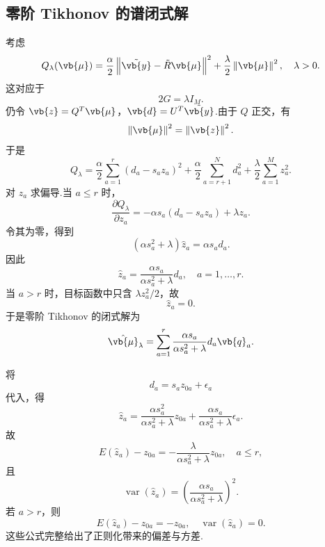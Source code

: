 \subsection{零阶 Tikhonov 的谱闭式解}

考虑
\begin{equation*}
	Q_\lambda(\vb{\mu})
	=\frac{\alpha}{2}\left\|\tilde{\vb{y}}-\tilde{R}\vb{\mu}\right\|^2
	+\frac{\lambda}{2}\left\|\vb{\mu}\right\|^2,
	\quad \lambda>0.
\end{equation*}
这对应于
\begin{equation*}
	2G=\lambda I_M.
\end{equation*}
仍令 \(\vb{z}=Q^T\vb{\mu}\)，\(\vb{d}=U^T\tilde{\vb{y}}\).由于 \(Q\) 正交，有
\begin{equation*}
	\left\|\vb{\mu}\right\|^2
	=\left\|\vb{z}\right\|^2.
\end{equation*}
于是
\begin{equation*}
	Q_\lambda
	=\frac{\alpha}{2}\sum_{a=1}^{r}(d_a-s_az_a)^2
	+\frac{\alpha}{2}\sum_{a=r+1}^{N}d_a^2
	+\frac{\lambda}{2}\sum_{a=1}^{M}z_a^2.
\end{equation*}
对 \(z_a\) 求偏导.当 \(a\leq r\) 时，
\begin{equation*}
	\frac{\partial Q_\lambda}{\partial z_a}
	=-\alpha s_a(d_a-s_az_a)+\lambda z_a.
\end{equation*}
令其为零，得到
\begin{equation*}
	(\alpha s_a^2+\lambda)\hat{z}_a
	=\alpha s_ad_a.
\end{equation*}
因此
\begin{equation*}
	\hat{z}_a
	=\frac{\alpha s_a}{\alpha s_a^2+\lambda}d_a,
	\quad a=1,\ldots,r.
\end{equation*}
当 \(a>r\) 时，目标函数中只含 \(\lambda z_a^2/2\)，故
\begin{equation*}
	\hat{z}_a=0.
\end{equation*}
于是零阶 Tikhonov 的闭式解为
\begin{equation*}
	\hat{\vb{\mu}}_\lambda
	=\sum_{a=1}^{r}
	\frac{\alpha s_a}{\alpha s_a^2+\lambda}
	d_a\vb{q}_a.
\end{equation*}

将
\begin{equation*}
	d_a=s_az_{0a}+\epsilon_a
\end{equation*}
代入，得
\begin{equation*}
	\hat{z}_a
	=\frac{\alpha s_a^2}{\alpha s_a^2+\lambda}z_{0a}
	+\frac{\alpha s_a}{\alpha s_a^2+\lambda}\epsilon_a.
\end{equation*}
故
\begin{equation*}
	E(\hat{z}_a)-z_{0a}
	=-\frac{\lambda}{\alpha s_a^2+\lambda}z_{0a},
	\quad a\leq r,
\end{equation*}
且
\begin{equation*}
	\operatorname{var}(\hat{z}_a)
	=\left(\frac{\alpha s_a}{\alpha s_a^2+\lambda}\right)^2.
\end{equation*}
若 \(a>r\)，则
\begin{equation*}
	E(\hat{z}_a)-z_{0a}=-z_{0a},\quad
	\operatorname{var}(\hat{z}_a)=0.
\end{equation*}
这些公式完整给出了正则化带来的偏差与方差.

